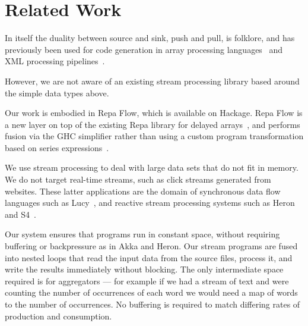 \section{Related Work}


In itself the duality between source and sink, push and pull, is folklore, and has previously been used for code generation in array processing languages~\cite{Claessen:ExpressiveArray,Svensson:Defunctionalizing} and XML processing pipelines~\cite{Kay:YouPull}. 

However, we are not aware of an existing stream processing library based around the simple data types above.

Our work is embodied in Repa Flow, which is available on Hackage. Repa Flow is a new layer on top of the existing Repa library for delayed arrays~\cite{Lippmeier:Guiding}, and performs fusion via the GHC simplifier rather than using a custom program transformation based on series expressions~\cite{Lippmeier:DataFlow}.

We use stream processing to deal with large data sets that do not fit in memory. We do not target real-time streams, such as click streams generated from websites. These latter applications are the domain of synchronous data flow languages such as Lucy~\cite{Mandel:Lucy}, and reactive stream processing systems such as Heron~\cite{Kulkarn:Heron} and S4~\cite{Neumeyer:S4}. 

Our system ensures that programs run in constant space, without requiring buffering or backpressure as in Akka and Heron. Our stream programs are fused into nested loops that read the input data from the source files, process it, and write the results immediately without blocking. The only intermediate space required is for aggregators --- for example if we had a stream of text and were counting the number of occurrences of each word we would need a map of words to the number of occurrences. No buffering is required to match differing rates of production and consumption.


